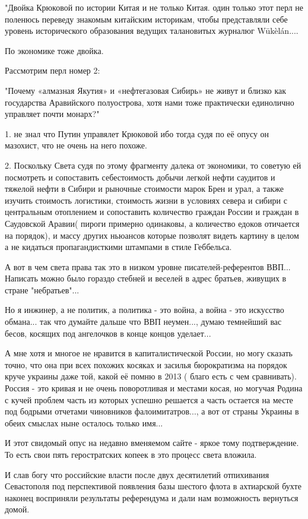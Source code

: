 \begin{itemize}
"Двойка Крюковой по истории Китая и не только Китая. один только этот перл не
поленюсь переведу знакомым китайским историкам, чтобы представляли себе уровень
исторического образования ведущих талановитых журналюг Wūkèlán....

По экономике тоже двойка.

Рассмотрим перл номер 2:

"Почему «алмазная Якутия» и «нефтегазовая Сибирь» не живут и близко как
государства Аравийского полуострова, хотя нами тоже практически единолично
управляет почти монарх?"

1. не знал что Путин управялет Крюковой ибо тогда судя по её опусу он мазохист,
что не очень на него похоже.

2. Поскольку Света судя по этому фрагменту далека от экономики, то советую ей
посмотреть и сопоставить себестоимость добычи легкой нефти саудитов и тяжелой
нефти в Сибири и рыночные стоимости марок Брен и урал, а также изучить
стоимость логистики, стоимость жизни в условиях севера и сибири с центральным
отоплением и сопоставить количество граждан России и граждан в Саудовской
Аравии( пироги примерно одинаковы, а количество едоков отичается на порядок), и
массу других ньюансов которые позволят видеть картину в целом а не кидаться
пропагандисткими штампами в стиле Геббельса.

А вот в чем света права так это в низком уровне писателей-референтов ВВП...
Написать можно было гораздо стебней и веселей в адрес братьев, живущих в стране
"небратьев"...

Но я инжинер, а не политик, а политика - это война, а война - это искусство
обмана... так что думайте дальше что ВВП неумен..., думаю темнейший вас бесов,
косящих под ангелочков в конце концов уделает...

А мне хотя и многое не нравится в капиталистической России, но могу сказать
точно, что она при всех похожих косяках и засилья бюрократизма на порядок круче
украины даже той, какой её помню в 2013 ( благо есть с чем сравнивать). Россия
- это кривая и не очень поворотливая и местами косая, но могучая Родина с кучей
проблем часть из которых успешно решается а часть остается на месте под бодрыми
отчетами чиновников фалоимитатров..., а вот от страны Украины в обеих смыслах
ныне осталось только имя...

И этот свидомый опус на недавно вменяемом сайте - яркое тому подтверждение. То
есть свои пять геростратских копеек в это процесс света вложила.

И слав богу что российские власти после двух десятилетий отпихивания
Севастополя под перспективой появления базы шестого флота в ахтиарской бухте
наконец восприняли результаты референдума и дали нам возможность вернуться
домой.


\end{itemize}

